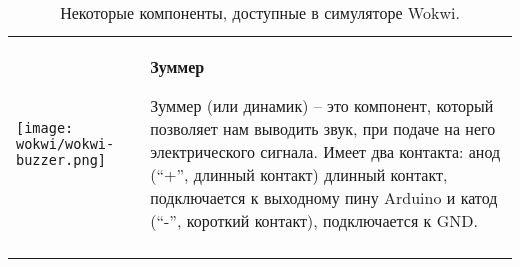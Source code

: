 \documentclass[../sparc.tex]{subfiles}
\begin{document}
\begin{longtable}{|>{
      \centering\arraybackslash
    }p{3cm}|>{
      \centering\arraybackslash}p{8cm}|
  }
{} \\  \hline

\parbox[t][1,8cm][c]{2cm}{\centering \vspace{1cm}
  \texttt{[image: wokwi/wokwi-buzzer.png]}} &
\parbox[t][3.6cm][t]{8cm}{\centering \textbf{Зуммер}\\ \raggedright

  Зуммер (или динамик) -- это компонент, который позволяет нам выводить звук, при
  подаче на него электрического сигнала.  Имеет два контакта: анод (``+'',
  длинный контакт) длинный контакт, подключается к выходному пину Arduino и
  катод (``-'', короткий контакт), подключается к GND.

} \\  \hline

\caption{Некоторые компоненты, доступные в симуляторе Wokwi.}
\end{longtable}
\end{document}
